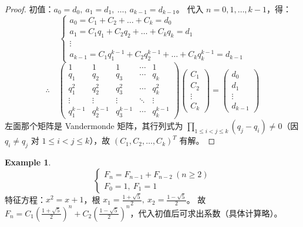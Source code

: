 \documentclass[oneside]{book}
\theoremstyle{definition}
\newtheorem{example}{Example}[section]
\begin{document}
\begin{proof}
	初值：\( a_0 = d_0, \ a_1 = d_1, \ \dots, \ a_{k-1} = d_{k-1} \)。
	代入 \( n = 0, 1, \dots, k-1 \)，得：
	\[
	\begin{cases}
		a_0 = C_1 + C_2 + \dots + C_k = d_0 \\
		a_1 = C_1 q_1 + C_2 q_2 + \dots + C_k q_k = d_1 \\
		\vdots \\
		a_{k-1} = C_1 q_1^{k-1} + C_2 q_2^{k-1} + \dots + C_k q_k^{k-1} = d_{k-1}
	\end{cases}
	\]
	\[
	\therefore \quad
	\begin{pmatrix}
		1 & 1 & 1 & \cdots & 1 \\
		q_1 & q_2 & q_3 & \cdots & q_k \\
		q_1^2 & q_2^2 & q_3^2 & \cdots & q_k^2 \\
		\vdots & \vdots & \vdots & \ddots & \vdots \\
		q_1^{k-1} & q_2^{k-1} & q_3^{k-1} & \cdots & q_k^{k-1}
	\end{pmatrix}
	\begin{pmatrix}
		C_1 \\
		C_2 \\
		\vdots \\
		C_k
	\end{pmatrix}
	=
	\begin{pmatrix}
		d_0 \\
		d_1 \\
		\vdots \\
		d_{k-1}
	\end{pmatrix}
	\]
	左面那个矩阵是 Vandermonde 矩阵，其行列式为 \( \prod_{1 \leq i < j \leq k} (q_j - q_i) \neq 0 \)（因 \( q_i \neq q_j \) 对 \( 1 \leq i < j \leq k \)），故 \( (C_1, C_2, \dots, C_k)^T \) 有解。
\end{proof}

\begin{example}
	\[
	\begin{cases}
		F_n = F_{n-1} + F_{n-2} \ (n \geq 2) \\
		F_0 = 1, \ F_1 = 1
	\end{cases}
	\]
	特征方程：\( x^2 = x + 1 \)，根 \( x_1 = \frac{1 + \sqrt{5}}{2}, \ x_2 = \frac{1 - \sqrt{5}}{2} \)。
	故 \( F_n = C_1 \left( \frac{1 + \sqrt{5}}{2} \right)^n + C_2 \left( \frac{1 - \sqrt{5}}{2} \right)^n \)，代入初值后可求出系数（具体计算略）。
\end{example}
\end{document}
